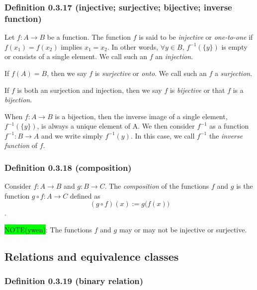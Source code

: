 \documentclass[12pt, letterpaper, oneside]{book}
\begin{document}
\subsubsection{Definition 0.3.17 (injective; surjective; bijective; inverse function)}

Let $f: A \rightarrow B$ be a function. The function $f$ is said to be
\textit{injective} or \textit{one-to-one} if $f(x_1) = f(x_2)$ implies $x_1 =
  x_2$. In other words, $\forall y \in B$, $f^{-1}(\{y\})$ is empty or consists
of a single element. We call such an $f$ an \textit{injection}.

If $f(A) = B$, then we say $f$ is \textit{surjective} or \textit{onto}. We call
such an $f$ a \textit{surjection}.

If $f$ is both an surjection and injection, then we say $f$ is
\textit{bijective} or that $f$ is a \textit{bijection}.

When $f: A \rightarrow B$ is a bijection, then the inverse image of a single
element, $f^{-1}(\{y\})$, is always a unique element of A. We then consider
$f^{-1}$ as a function $f^{-1}: B \rightarrow A$ and we write simply
$f^{-1}(y)$. In this case, we call $f^{-1}$ the \textit{inverse function} of
$f$.

\subsubsection{Definition 0.3.18 (composition)}

Consider $f: A \rightarrow B$ and $g: B \rightarrow C$. The \textit{composition}
of the functions $f$ and $g$ is the function $g \circ f: A \rightarrow C$
defined as \[(g \circ f)(x) := g \bigl(f(x)\bigr)\].

\colorbox{lime}{NOTE(ywen)}: The functions $f$ and $g$ may or may not be
injective or surjective.

\subsection{Relations and equivalence classes}

\subsubsection{Definition 0.3.19 (binary relation)}
\end{document}
